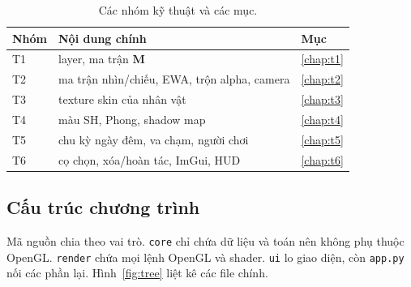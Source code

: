\documentclass[9pt,twocolumn,a4paper]{extarticle}
\newcommand{\code}[1]{\texttt{#1}}
\begin{document}
\begin{table}[H]
\centering
\caption{Các nhóm kỹ thuật và các mục.}
\label{tab:map}
\footnotesize
\begin{tabular}{@{}lll@{}}
\toprule
Nhóm & Nội dung chính & Mục \\
\midrule
T1 & layer, ma trận $\mathbf{M}$ & \ref{chap:t1} \\
T2 & ma trận nhìn/chiếu, EWA, trộn alpha, camera & \ref{chap:t2} \\
T3 & texture skin của nhân vật & \ref{chap:t3} \\
T4 & màu SH, Phong, shadow map & \ref{chap:t4} \\
T5 & chu kỳ ngày đêm, va chạm, người chơi & \ref{chap:t5} \\
T6 & cọ chọn, xóa/hoàn tác, ImGui, HUD & \ref{chap:t6} \\
\bottomrule
\end{tabular}
\end{table}

\subsection{Cấu trúc chương trình}
Mã nguồn chia theo vai trò. \code{core} chỉ chứa dữ liệu và toán nên không phụ thuộc OpenGL. \code{render} chứa mọi lệnh OpenGL và shader. \code{ui} lo giao diện, còn \code{app.py} nối các phần lại. Hình~\ref{fig:tree} liệt kê các file chính.
\end{document}
